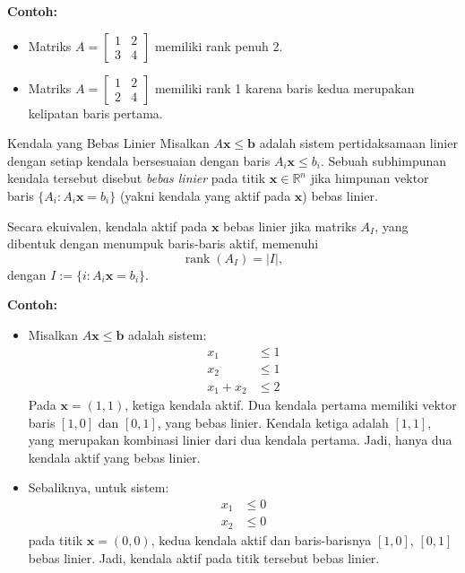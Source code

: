 \textbf{Contoh:}
\begin{itemize}
    \item Matriks \( A = \begin{bmatrix}1 & 2 \\ 3 & 4\end{bmatrix} \) memiliki rank penuh 2.
    \item Matriks \( A = \begin{bmatrix}1 & 2 \\ 2 & 4\end{bmatrix} \) memiliki rank 1 karena baris kedua merupakan kelipatan baris pertama.
\end{itemize}

\vspace{1em}

\begin{definition}{Kendala yang Bebas Linier}{}
Misalkan \( A \mathbf{x} \leq \mathbf{b} \) adalah sistem pertidaksamaan linier dengan setiap kendala bersesuaian dengan baris \( A_i \mathbf{x} \leq b_i \). Sebuah subhimpunan kendala tersebut disebut \emph{bebas linier} pada titik \( \mathbf{x} \in \mathbb{R}^n \) jika himpunan vektor baris \( \{ A_i : A_i \mathbf{x} = b_i \} \) (yakni kendala yang aktif pada \( \mathbf{x} \)) bebas linier.

Secara ekuivalen, kendala aktif pada \( \mathbf{x} \) bebas linier jika matriks \( A_I \), yang dibentuk dengan menumpuk baris-baris aktif, memenuhi
\[
\operatorname{rank}(A_I) = |I|,
\]
dengan \( I := \{ i : A_i \mathbf{x} = b_i \} \).
\end{definition}

\textbf{Contoh:}
\begin{itemize}
    \item Misalkan \( A \mathbf{x} \leq \mathbf{b} \) adalah sistem:
    \[
    \begin{aligned}
    x_1 &\leq 1 \\
    x_2 &\leq 1 \\
    x_1 + x_2 &\leq 2
    \end{aligned}
    \]
    Pada \( \mathbf{x} = (1, 1) \), ketiga kendala aktif. Dua kendala pertama memiliki vektor baris \( [1,0] \) dan \( [0,1] \), yang bebas linier. Kendala ketiga adalah \( [1,1] \), yang merupakan kombinasi linier dari dua kendala pertama. Jadi, hanya dua kendala aktif yang bebas linier.
    
    \item Sebaliknya, untuk sistem:
    \[
    \begin{aligned}
    x_1 &\leq 0 \\
    x_2 &\leq 0
    \end{aligned}
    \]
    pada titik \( \mathbf{x} = (0,0) \), kedua kendala aktif dan baris-barisnya \( [1,0] \), \( [0,1] \) bebas linier. Jadi, kendala aktif pada titik tersebut bebas linier.
\end{itemize}

